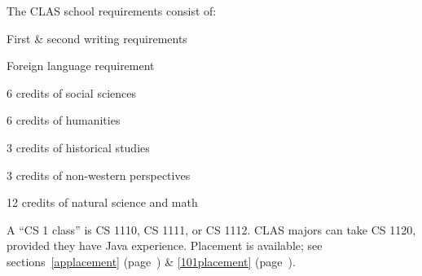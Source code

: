 The CLAS school requirements consist of:
\begin{itemlist}
\item First \& second writing requirements
\item Foreign language requirement
\item 6 credits of social sciences
\item 6 credits of humanities
\item 3 credits of historical studies
\item 3 credits of non-western perspectives
\item 12 credits of natural science and math
\end{itemlist}


 A ``CS 1 class'' is CS
1110, CS 1111, or CS 1112.  CLAS majors can take CS 1120, provided
they have Java experience.  Placement is available; see
sections~\ref{applacement} (page~\pageref{applacement}) \&
\ref{101placement} (page~\pageref{101placement}).

